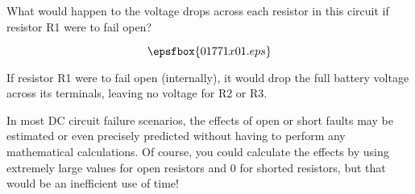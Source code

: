 

What would happen to the voltage drops across each resistor in this circuit if resistor R1 were to fail open?

$$\epsfbox{01771x01.eps}$$







If resistor R1 were to fail open (internally), it would drop the full battery voltage across its terminals, leaving no voltage for R2 or R3.







In most DC circuit failure scenarios, the effects of open or short faults may be estimated or even precisely predicted without having to perform any mathematical calculations.  Of course, you could calculate the effects by using extremely large values for open resistors and 0 for shorted resistors, but that would be an inefficient use of time!




